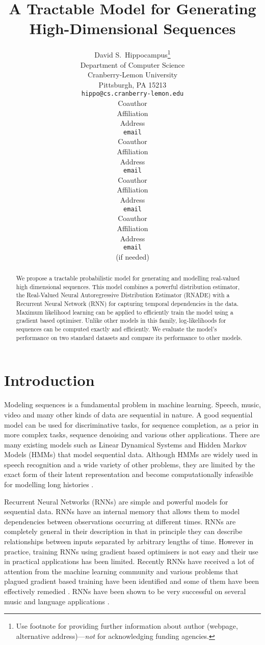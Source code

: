 \documentclass{article} %
\title{A Tractable Model for Generating High-Dimensional Sequences}
\author{
David S.~Hippocampus\thanks{ Use footnote for providing further information
about author (webpage, alternative address)---\emph{not} for acknowledging
funding agencies.} \\
Department of Computer Science\\
Cranberry-Lemon University\\
Pittsburgh, PA 15213 \\
\texttt{hippo@cs.cranberry-lemon.edu} \\
\And
Coauthor \\
Affiliation \\
Address \\
\texttt{email} \\
\AND
Coauthor \\
Affiliation \\
Address \\
\texttt{email} \\
\And
Coauthor \\
Affiliation \\
Address \\
\texttt{email} \\
\And
Coauthor \\
Affiliation \\
Address \\
\texttt{email} \\
(if needed)\\
}
\begin{document}
\maketitle

\begin{abstract}
We propose a tractable probabilistic model for generating and modelling real-valued high dimensional sequences. This model combines a powerful distribution estimator, the Real-Valued Neural Autoregressive Distribution Estimator (RNADE) with a Recurrent Neural Network (RNN) for capturing temporal dependencies in the data. Maximum likelihood learning can be applied to efficiently train the model using a gradient based optimiser. Unlike other models in this family, log-likelihoods for sequences can be computed exactly and efficiently. We evaluate the model's performance on two standard datasets and compare its performance to other models. 
\end{abstract}

\section{Introduction}
\label{intro}
Modeling sequences is a fundamental problem in machine learning. Speech, music, video and many other kinds of data are sequential in nature. A good sequential model can be used for discriminative tasks, for sequence completion, as a prior in more complex tasks, sequence denoising and various other applications. There are many existing models such as Linear Dynamical Systems and Hidden Markov Models (HMMs) that model sequential data. Although HMMs are widely used in speech recognition and a wide variety of other problems, they are limited by the exact form of their latent representation and become computationally infeasible for modelling long histories \cite{sutskever2007learning}. 

Recurrent Neural Networks (RNNs) are simple and powerful models for sequential data. RNNs have an internal memory that allows them to model dependencies between observations occurring at different times. RNNs are completely general in their description in that in principle they can describe relationships between inputs separated by arbitrary lengths of time. However in practice, training RNNs using gradient based optimisers is not easy and their use in practical applications has been limited. Recently RNNs have received a lot of attention from the machine learning community and various problems that plagued gradient based training have been identified and some of them have been effectively remedied \cite{Martens2011,bengio2012advances}. RNNs have been shown to be very successful on several music and language applications \cite{mikolov2011empirical,Boulanger-Lewandowski2012,bengio2012advances}. 
\end{document}
